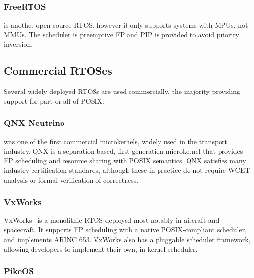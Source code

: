 \subsubsection{FreeRTOS}

\citet{FreeRTOS:URL} is another open-source \gls{RTOS}, however it only supports systems with \glspl{MPU}, not
\glspl{MMU}. The scheduler is preemptive \gls{FP} and \gls{PIP} is provided to avoid priority inversion.


\subsection{Commercial RTOSes}

Several widely deployed \glspl{RTOS} are used commercially, the majority providing support for part or
all of \gls{POSIX}.  

\subsubsection{QNX Neutrino}

\citet{QNX_10} was one of the first commercial microkernels, widely used in the transport industry.
QNX is a separation-based, first-generation microkernel that provides
\gls{FP} scheduling and resource sharing with POSIX semantics.  QNX satisfies many industry
certification standards, although these in practice do not require {\gls{WCET}} analysis or formal
verification of correctness. 

\subsubsection{VxWorks}

VxWorks~\citep{VxWorks_08} is a monolithic \gls{RTOS} deployed most notably in aircraft
and spacecraft.  It supports \gls{FP} scheduling with a native POSIX-compliant scheduler, and
implements ARINC 653.  VxWorks
also has a pluggable scheduler framework, allowing developers to implement their own, in-kernel
scheduler.

\subsubsection{PikeOS}

